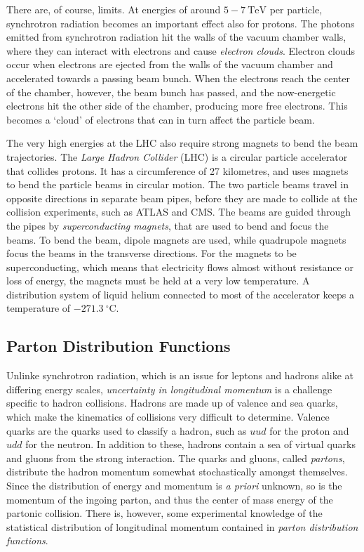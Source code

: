 \documentclass[twoside,english]{uiofysmaster}
\begin{document}
{There are, of course, limits. At energies of around $5-7~\mathrm{TeV}$ per particle, synchrotron radiation becomes an important effect also for protons. The photons emitted from synchrotron radiation hit the walls of the vacuum chamber walls, where they can interact with electrons and cause \textit{electron clouds}. Electron clouds occur when electrons are ejected from the walls of the vacuum chamber and accelerated towards a passing beam bunch. When the electrons reach the center of the chamber, however, the beam bunch has passed, and the now-energetic electrons hit the other side of the chamber, producing more free electrons. This becomes a `cloud' of electrons that can in turn affect the particle beam. 

The very high energies at the LHC also require strong magnets to bend the beam trajectories. The \textit{Large Hadron Collider} (LHC) is a circular particle accelerator that collides protons. It has a circumference of 27 kilometres, and uses magnets to bend the particle beams in circular motion. The two particle beams travel in opposite directions in separate beam pipes, before they are made to collide at the collision experiments, such as ATLAS and CMS. The beams are guided through the pipes by \textit{superconducting magnets}, that are used to bend and focus the beams. To bend the beam, dipole magnets are used, while quadrupole magnets focus the beams in the transverse directions. For the magnets to be superconducting, which means that electricity flows almost without resistance or loss of energy, the magnets must be held at a very low temperature. A distribution system of liquid helium connected to most of the accelerator keeps a temperature of $-271.3~ ^{\circ}\mathrm{C}$. 

\subsection{Parton Distribution Functions}\label{Sec:: susy hadron : Parton Distribution Functions}

Unlinke synchrotron radiation, which is an issue for leptons and hadrons alike at differing energy scales, \textit{uncertainty in longitudinal momentum} is a challenge specific to hadron collisions. Hadrons are made up of valence and sea quarks, which make the kinematics of collisions very difficult to determine. Valence quarks are the quarks used to classify a hadron, such as $uud$ for the proton and $udd$ for the neutron. In addition to these, hadrons contain a sea of virtual quarks and gluons from the strong interaction. The quarks and gluons, called \textit{partons}, distribute the hadron momentum somewhat stochastically amongst themselves. Since the distribution of energy and momentum is \textit{a priori} unknown, so is the momentum of the ingoing parton, and thus the center of mass energy of the partonic collision. There is, however, some experimental knowledge of the statistical distribution of longitudinal momentum contained in \textit{parton distribution functions}.

}
\end{document}
